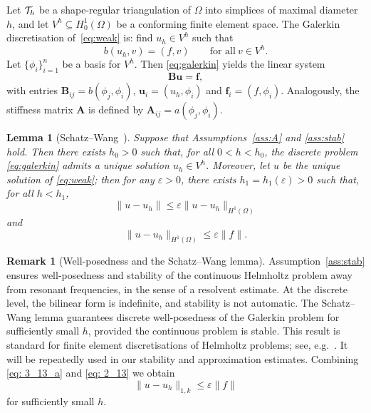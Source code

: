 \documentclass[preprint,3p,times]{elsarticle}
\newtheorem{lemma}[theorem]{Lemma}
\theoremstyle{definition}
\newtheorem{remark}[theorem]{Remark}
\numberwithin{equation}{section}
\begin{document}
Let ${\cal T}_h$ be a shape-regular triangulation of $\Omega$ into simplices of maximal diameter $h$, and let $V^h\subseteq H^1_0(\Omega)$ 
be a conforming finite element space.  The Galerkin discretisation of~\eqref{eq:weak} is: find $u_h\in V^h$ such that
\begin{equation}\label{eq:galerkin}
	b(u_h,v) = (f,v) \qquad \text{for all} \ v\in V^h.
\end{equation}
Let $\{\phi_i\}_{i=1}^n$ be a basis for $V^h$. Then \eqref{eq:galerkin} yields the linear system
\begin{equation}\label{eq:lin_sys}
	\mathbf{B}\mathbf{u} = \mathbf{f}, 
\end{equation}
with entries $\mathbf{B}_{ij} = b(\phi_j,\phi_i)$, $\mathbf{u}_i = (u_h,\phi_i)$ and $\mathbf{f}_i = (f,\phi_i)$. 
Analogously, the stiffness matrix $\mathbf{A}$ is defined by $\mathbf{A}_{ij} = a(\phi_j,\phi_i)$.

\begin{lemma}[Schatz--Wang~\cite{Schatz:1996:SNE}]
\label{lem:schatz_wang}
Suppose that Assumptions~\ref{ass:A} and \ref{ass:stab} hold. Then there exists \( h_0 > 0 \) such that, for all \( 0 < h < h_0 \), 
the discrete problem \eqref{eq:galerkin} admits a unique solution \( u_h \in V^h \). 
Moreover, {let $u$ be the unique solution of \eqref{eq:weak}; 
then} for any \( \varepsilon > 0 \), there exists \( h_1 = h_1(\varepsilon) > 0 \) such that, for all \( h < h_1 \),
\begin{equation}\label{eq: 3_13_a}
	\| u - u_h \| \le \varepsilon \| u - u_h \|_{H^1(\Omega)}
\end{equation}
and
\begin{equation}\label{eq: 2_13}
	\| u - u_h \|_{H^1(\Omega)} \le \varepsilon \| f \|. 
\end{equation}
\end{lemma}

{\begin{remark}[Well-posedness and the Schatz--Wang lemma] \label{rem:schatz_wang}
Assumption~\ref{ass:stab} ensures well-posedness and stability of the continuous Helmholtz problem away from resonant frequencies, 
in the sense of a resolvent estimate.
At the discrete level, the bilinear form is indefinite, and stability is not automatic. 
The Schatz--Wang lemma guarantees discrete well-posedness of the Galerkin problem for sufficiently small $h$, provided the continuous problem is stable. 
This result is standard for finite element discretisations of Helmholtz problems; see, e.g.\ \cite{Ihlenburg:1998:FEA, Melenk:2011:WEC}. 
It will be repeatedly used in our stability and approximation estimates.
Combining \eqref{eq: 3_13_a} and \eqref{eq: 2_13} we obtain 
\begin{equation}\label{schatz_wang_1_k}
	\|u-u_h\|_{1,k} \le \varepsilon \|f\|
\end{equation}
for sufficiently small $h$.
\end{remark}
}
\end{document}
